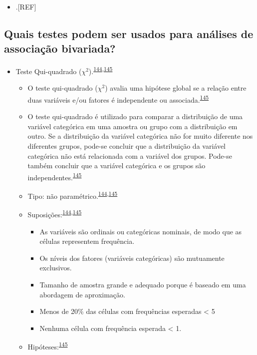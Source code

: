 \documentclass[
  a4paper,
]{book}
\providecommand{\tightlist}{%
  \setlength{\itemsep}{0pt}\setlength{\parskip}{0pt}}
\begin{document}
\begin{itemize}
\tightlist
\item
  .{[}REF{]}
\end{itemize}

\hypertarget{quais-testes-podem-ser-usados-para-anuxe1lises-de-associauxe7uxe3o-bivariada}{%
\subsection{Quais testes podem ser usados para análises de associação bivariada?}\label{quais-testes-podem-ser-usados-para-anuxe1lises-de-associauxe7uxe3o-bivariada}}

\begin{itemize}
\item
  Teste Qui-quadrado (\(\chi^2\)).\textsuperscript{\protect\hyperlink{ref-McHugh2013}{144},\protect\hyperlink{ref-Kim2017a}{145}}

  \begin{itemize}
  \item
    O teste qui-quadrado (\(\chi^2\)) avalia uma hipótese global se a relação entre duas variáveis e/ou fatores é independente ou associada.\textsuperscript{\protect\hyperlink{ref-Kim2017a}{145}}
  \item
    O teste qui-quadrado é utilizado para comparar a distribuição de uma variável categórica em uma amostra ou grupo com a distribuição em outro. Se a distribuição da variável categórica não for muito diferente nos diferentes grupos, pode-se concluir que a distribuição da variável categórica não está relacionada com a variável dos grupos. Pode-se também concluir que a variável categórica e os grupos são independentes.\textsuperscript{\protect\hyperlink{ref-Kim2017a}{145}}
  \item
    Tipo: não paramétrico.\textsuperscript{\protect\hyperlink{ref-McHugh2013}{144},\protect\hyperlink{ref-Kim2017a}{145}}
  \item
    Suposições:\textsuperscript{\protect\hyperlink{ref-McHugh2013}{144},\protect\hyperlink{ref-Kim2017a}{145}}

    \begin{itemize}
    \item
      As variáveis são ordinais ou categóricas nominais, de modo que as células representem frequência.
    \item
      Os níveis dos fatores (variáveis categóricas) são mutuamente exclusivos.
    \item
      Tamanho de amostra grande e adequado porque é baseado em uma abordagem de aproximação.
    \item
      Menos de 20\% das células com frequências esperadas \textless{} 5
    \item
      Nenhuma célula com frequência esperada \textless{} 1.
    \end{itemize}
  \item
    Hipóteses:\textsuperscript{\protect\hyperlink{ref-Kim2017a}{145}}


\end{itemize}
\end{itemize}
\end{document}
